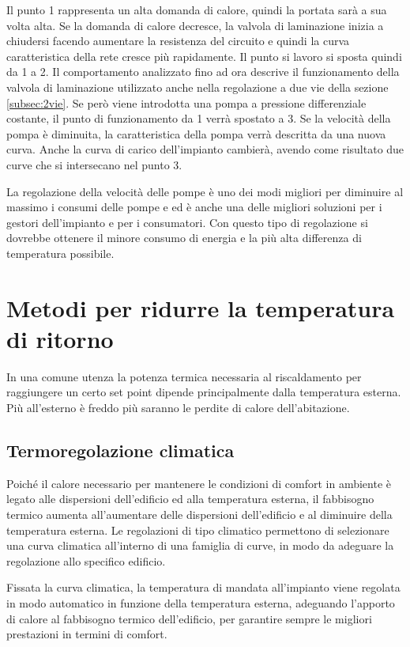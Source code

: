 \documentclass[laurea,oneside,11pt]{USiena_tesiLM}
\begin{document}
Il punto 1 rappresenta un alta domanda di calore, quindi la portata sarà a sua volta alta. Se la domanda di calore decresce, la valvola di laminazione inizia a chiudersi facendo aumentare la resistenza del circuito e quindi la curva caratteristica della rete cresce più rapidamente. Il punto si lavoro si sposta quindi da 1 a 2. Il comportamento analizzato fino ad ora descrive il funzionamento della valvola di laminazione utilizzato anche nella regolazione a due vie della sezione \ref{subsec:2vie}. Se però viene introdotta una pompa a pressione differenziale costante, il punto di funzionamento da 1 verrà spostato a 3. Se la velocità della pompa è diminuita, la caratteristica della pompa verrà descritta da una nuova curva. Anche la curva di carico dell'impianto cambierà, avendo come risultato due curve che si intersecano nel punto 3.      

La regolazione della velocità delle pompe è uno dei modi migliori per diminuire al massimo i consumi delle pompe e ed è anche una delle migliori soluzioni per i gestori dell'impianto e per i consumatori. Con questo tipo di regolazione si dovrebbe ottenere il minore consumo di energia e la più alta differenza di temperatura possibile.

\section{Metodi per ridurre la temperatura di ritorno}  

In una comune utenza la potenza termica necessaria al riscaldamento per raggiungere un certo set point dipende principalmente dalla temperatura esterna. Più all'esterno è freddo più saranno le perdite di calore dell'abitazione.


\subsection{Termoregolazione climatica}
Poiché il calore necessario per mantenere le condizioni di comfort in ambiente è legato alle dispersioni dell'edificio ed alla temperatura esterna, il fabbisogno termico aumenta all'aumentare delle dispersioni dell'edificio e al diminuire della temperatura esterna. Le regolazioni di tipo climatico permettono di selezionare una curva climatica all'interno di una famiglia di curve, in modo da adeguare la regolazione allo specifico edificio. 

Fissata la curva climatica, la temperatura di mandata all'impianto viene regolata in modo automatico in funzione della temperatura esterna, adeguando l'apporto di calore al fabbisogno termico dell'edificio, per garantire sempre le migliori prestazioni in termini di comfort. 
\end{document}
